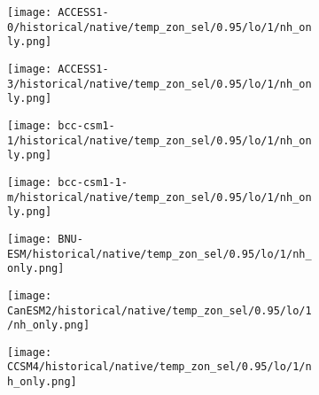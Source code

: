 \documentclass[preview]{standalone}
\begin{document}
\begin{figure}
  \begin{subfigure}[t]{\textwidth}
    \texttt{[image: ACCESS1-0/historical/native/temp\_zon\_sel/0.95/lo/1/nh\_only.png]}
  \end{subfigure}
\end{figure}

\begin{figure}
  \begin{subfigure}[t]{\textwidth}
    \texttt{[image: ACCESS1-3/historical/native/temp\_zon\_sel/0.95/lo/1/nh\_only.png]}
  \end{subfigure}
\end{figure}

\begin{figure}
  \begin{subfigure}[t]{\textwidth}
    \texttt{[image: bcc-csm1-1/historical/native/temp\_zon\_sel/0.95/lo/1/nh\_only.png]}
  \end{subfigure}
\end{figure}

\begin{figure}
  \begin{subfigure}[t]{\textwidth}
    \texttt{[image: bcc-csm1-1-m/historical/native/temp\_zon\_sel/0.95/lo/1/nh\_only.png]}
  \end{subfigure}
\end{figure}

\begin{figure}
  \begin{subfigure}[t]{\textwidth}
    \texttt{[image: BNU-ESM/historical/native/temp\_zon\_sel/0.95/lo/1/nh\_only.png]}
  \end{subfigure}
\end{figure}

\begin{figure}
  \begin{subfigure}[t]{\textwidth}
    \texttt{[image: CanESM2/historical/native/temp\_zon\_sel/0.95/lo/1/nh\_only.png]}
  \end{subfigure}
\end{figure}

\begin{figure}
  \begin{subfigure}[t]{\textwidth}
    \texttt{[image: CCSM4/historical/native/temp\_zon\_sel/0.95/lo/1/nh\_only.png]}
  \end{subfigure}
\end{figure}
\end{document}
